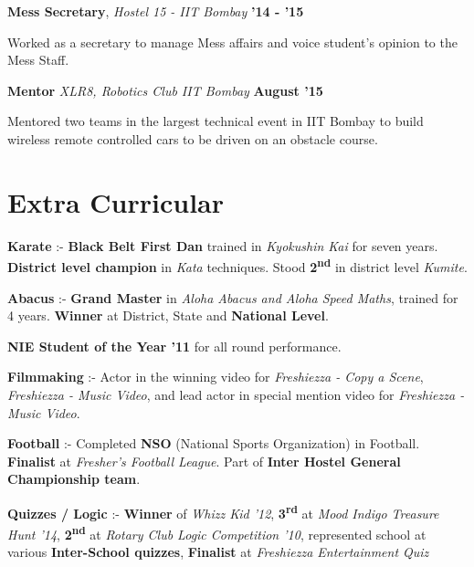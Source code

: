 \documentclass[11pt]{resume}
\begin{document}
\begin{resume}
\textbf{Mess Secretary}, \textit{Hostel 15 - IIT Bombay} \hfill \textbf{'14 - '15}\\
\vspace{-4mm}
\begin{list2}
\item Worked as a secretary to manage Mess affairs and voice student's opinion to the Mess Staff.
\end{list2}

\textbf{Mentor} \textit{XLR8, Robotics Club IIT Bombay} \hfill \textbf{August '15}

\begin{list2}
\item Mentored two teams in the largest technical event in IIT Bombay to build wireless remote controlled cars to be driven on an obstacle course.
\end{list2}
\vspace{-2.5mm}
\pagebreak
\section{\mysidestyle Extra Curricular}
\begin{list2}
\item \textbf {Karate} :- \textbf{Black Belt First Dan} trained in \textsl{Kyokushin Kai} for seven years. \textbf{District level champion} in \textsl{Kata} techniques. Stood \textbf {2\textsuperscript{nd}} in district level \textsl{Kumite}.

\item \textbf {Abacus} :- \textbf{Grand Master} in \textsl{Aloha Abacus and Aloha Speed Maths}, trained for 4 years. \textbf{Winner} at District, State and \textbf{National Level}. 

\item \textbf {NIE Student of the Year '11} for all round performance. 

\item \textbf {Filmmaking} :- Actor in the winning video for \textsl{Freshiezza - Copy a Scene}, \textsl{Freshiezza - Music Video}, and lead actor in special mention video for \textsl{Freshiezza - Music Video}.

\item \textbf {Football} :- Completed \textbf{NSO} (National Sports Organization) in Football. \textbf{Finalist} at \textsl{Fresher's Football League}. Part of \textbf{Inter Hostel General Championship team}.

\item \textbf {Quizzes / Logic} :- \textbf{Winner} of \textsl{Whizz Kid '12}, \textbf{3\textsuperscript{rd}} at \textsl{Mood Indigo Treasure Hunt '14}, \textbf{2\textsuperscript{nd}} at \textsl{Rotary Club Logic Competition '10}, represented school at various \textbf{Inter-School quizzes}, \textbf{Finalist} at \textsl{Freshiezza Entertainment Quiz}


\end{list2}
\end{resume}
\end{document}
